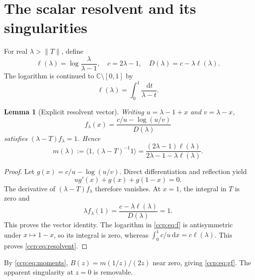\documentclass[11pt,letterpaper]{article}
\newtheorem{lemma}[theorem]{Lemma}
\theoremstyle{remark}\newtheorem{remark}[theorem]{Remark}
\newcommand{\dd}{\,\mathrm d}
\newcommand{\C}{\mathbb C}
\newcommand{\norm}[1]{\lVert #1\rVert}
\begin{document}
\section{The scalar resolvent and its singularities}
For real $\lambda>\norm T$, define
\[
\ell(\lambda)=\log\frac\lambda{\lambda-1},\quad
c=2\lambda-1,\quad D(\lambda)=c-\lambda\ell(\lambda).
\]
The logarithm is continued to $\C\setminus[0,1]$ by
\begin{equation}
\ell(\lambda)=\int_0^1\frac{\dd t}{\lambda-t}.\label{ccp:eq:ell}
\end{equation}

\begin{lemma}[Explicit resolvent vector]\label{ccp:lem:resolvent}
Writing $u=\lambda-1+x$ and $v=\lambda-x$,
\begin{equation}
f_\lambda(x)=\frac{c/u-\log(u/v)}{D(\lambda)}\label{ccp:eq:f}
\end{equation}
satisfies $(\lambda-T)f_\lambda=1$. Hence
\begin{equation}
m(\lambda):=\langle1,(\lambda-T)^{-1}1\rangle
 =\frac{(2\lambda-1)\ell(\lambda)}{2\lambda-1-\lambda\ell(\lambda)}.\label{ccp:eq:resolvent}
\end{equation}
\end{lemma}
\begin{proof}
Let $g(x)=c/u-\log(u/v)$. Direct differentiation and reflection yield
\[
ug'(x)+g(x)+g(1-x)=0.
\]
The derivative of $(\lambda-T)f_\lambda$ therefore vanishes. At $x=1$, the integral in $T$ is zero and
\[
\lambda f_\lambda(1)=\frac{c-\lambda\ell(\lambda)}{D(\lambda)}=1.
\]
This proves the vector identity. The logarithm in \eqref{ccp:eq:f} is antisymmetric under $x\mapsto1-x$, so its integral is zero, whereas $\int_0^1c/u\dd x=c\ell(\lambda)$. This proves \eqref{ccp:eq:resolvent}.
\end{proof}

By \eqref{ccp:eq:moments}, $B(z)=m(1/z)/(2z)$ near zero, giving \eqref{ccp:eq:gf}. The apparent singularity at $z=0$ is removable.
\end{document}
